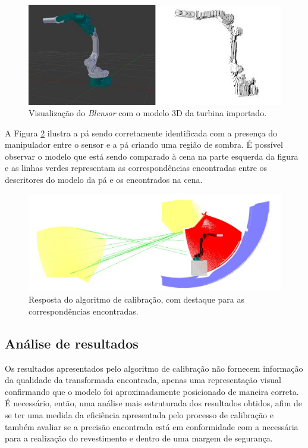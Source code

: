 \begin{figure}[H]
	\centering
	\includegraphics[width=0.9\columnwidth]{figs/calibracao/mh12_model}
	\caption{Visualização do \textit{Blensor} com o modelo 3D da turbina
	importado.}
    \label{fig::model_mh12}
\end{figure}

A Figura \ref{fig::sim_mh12}
ilustra a pá sendo corretamente identificada com a presença do manipulador entre
o sensor e a pá criando uma região de sombra. É possível observar o modelo que
está sendo comparado à cena na parte esquerda da figura e as linhas verdes
representam as correspondências encontradas entre os descritores do modelo da pá
e os encontrados na cena.

\begin{figure}[H]
	\centering
	\includegraphics[width=0.9\columnwidth]{figs/calibracao/sim_mh12_sp}
	\caption{Resposta do algoritmo de calibração, com destaque para as
	correspondências encontradas.}
    \label{fig::sim_mh12}
\end{figure}	



\subsection{Análise de resultados}

Os resultados apresentados pelo algoritmo de calibração não fornecem informação
da qualidade da transformada encontrada, apenas uma representação visual
confirmando que o modelo foi aproximadamente posicionado de maneira correta.
É necessário, então, uma análise mais estruturada dos resultados obtidos, afim
de se ter uma medida da eficiência apresentada pelo processo de calibração e
também avaliar se a precisão encontrada está em conformidade com a necessária
para a realização do revestimento e dentro de uma margem de segurança.

